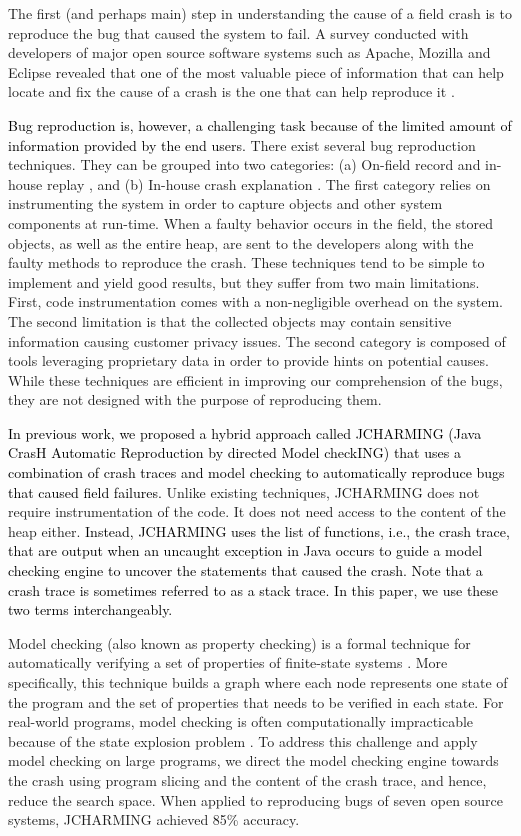 \documentclass[times, doublespace]{smrauth}
\newcommand{\red}[1]{\textcolor{black}{#1}}
\begin{document}
The first (and perhaps main) step in understanding the cause of a field crash is to reproduce the bug that caused the system to fail. A survey conducted with developers of major open source software systems such as Apache, Mozilla and Eclipse revealed that
one of the most valuable piece of information that can help
locate and fix the cause of a crash is the one that can help
reproduce it \cite{Bettenburg2008}.

\red{Bug reproduction is, however, a challenging task because of the limited amount of information  provided by the end users.} There exist several bug reproduction techniques. They can be grouped into two categories: (a)
On-field record and in-house replay \cite{Narayanasamy2005,Artzi2008,Jaygarl}, and (b) In-house crash explanation \cite{Manevich2004,chandra2009snugglebug}. The first category relies on
instrumenting the system in order to capture objects and other
system components at run-time. When a faulty behavior
occurs in the field, the stored objects, as well as the entire heap,
are sent to the developers along with the faulty methods to
reproduce the crash. These techniques tend to be simple to
implement and yield good results, but they suffer from two
main limitations. First, code instrumentation comes with a
non-negligible overhead on the system. The second limitation
is that the collected objects may contain sensitive information
causing customer privacy issues. The second category is
composed of tools leveraging proprietary data in order to
provide hints on potential causes. While these techniques are
efficient in improving our comprehension of the bugs, they are
not designed with the purpose of reproducing them.

\red{In previous work, we proposed a hybrid approach called JCHARMING
(Java CrasH Automatic Reproduction by directed Model
checkING) \cite{Nayrolles2015} that uses a combination of crash traces and model
checking to automatically reproduce bugs that caused field
failures.} Unlike existing techniques, JCHARMING does not
require instrumentation of the code. It does not need access to
the content of the heap either. \red{Instead, JCHARMING uses the list of functions, i.e., the crash trace, that are output when an uncaught exception in Java
occurs  to guide a model checking engine
to uncover the statements that caused the crash. Note that a crash trace is sometimes referred to as a stack trace. In this paper, we use these two terms interchangeably.}

Model checking (also known as property checking) is a formal
technique for automatically verifying a set of properties of
finite-state systems \cite{Baier2008}. More specifically, this technique
builds a graph where each node represents one
state of the program and the set of properties that needs to be
verified in each state. For real-world programs, model
checking is often computationally impracticable because of
the state explosion problem \cite{Baier2008}. To address this challenge and
apply model checking on large programs, we direct the model
checking engine towards the crash using program slicing and
the content of the crash trace, and hence, reduce the search
space. When applied to reproducing bugs of seven open source  systems, JCHARMING achieved
 85\% accuracy.
\end{document}
